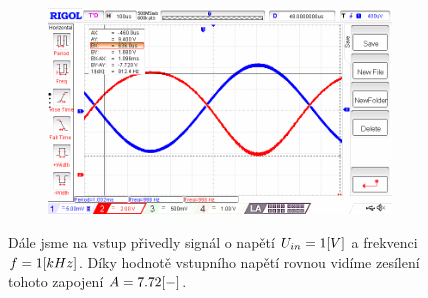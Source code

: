 \documentclass{article}
\begin{document}
\begin{figure}[H]
	\begin{minipage}[t]{0.6\textwidth}
    \vspace{-20mm}
    \begin{figure}[H]
      \includegraphics[width=\textwidth]{LAB/NewFile2.png}
      \caption{\label{obvod_z_laborky}}
    \end{figure}
  \end{minipage}
  \hfill
	\begin{minipage}[t]{0.35\textwidth}
    Dále jsme na  vstup přivedly signál o napětí \(U_{in} = 1\-[V]\) a frekvenci \(f = 1\-[kHz]\). 
    Díky hodnotě vstupního napětí rovnou vidíme zesílení tohoto zapojení \(A = 7.72\-[-]\).
  \end{minipage}
\end{figure}
\end{document}
